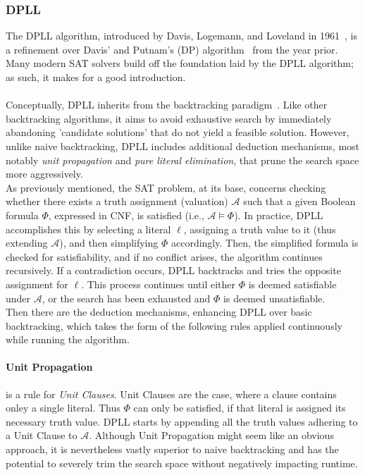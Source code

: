 \subsubsection{DPLL}
The DPLL algorithm, introduced by Davis, Logemann, and Loveland in 1961~\cite{Original-DPLL-Article}, is a refinement over Davis' and Putnam's (DP) algorithm~\cite{Original-DP-Article} from the year prior. Many modern SAT solvers build off the foundation laid by the DPLL algorithm; as such, it makes for a good introduction.
\\
\\
Conceptually, DPLL inherits from the backtracking paradigm~\cite{Wiki-backtracking}. Like other backtracking algorithms, it aims to avoid exhaustive search by immediately abandoning  'candidate solutions' that do not yield a feasible solution. However, unlike naive backtracking, DPLL includes additional deduction mechanisms, most notably \emph{unit propagation} and \emph{pure literal elimination}, that prune the search space more aggressively.
\\
As previously mentioned, the SAT problem, at its base, concerns checking whether there exists a truth assignment (valuation) \(\mathcal{A}\) such that a given Boolean formula \(\Phi\), expressed in CNF, is satisfied (i.e., \(\mathcal{A} \models \Phi\)). In practice, DPLL accomplishes this by selecting a literal \(\ell\), assigning a truth value to it (thus extending \(\mathcal{A}\)), and then simplifying \(\Phi\) accordingly. Then, the simplified formula is checked for satisfiability, and if no conflict arises, the algorithm continues recursively. If a contradiction occurs, DPLL backtracks and tries the opposite assignment for \(\ell\). This process continues until either \(\Phi\) is deemed satisfiable under \(\mathcal{A}\), or the search has been exhausted and \(\Phi\) is deemed unsatisfiable.
\\
Then there are the deduction mechanisms, enhancing DPLL over basic backtracking, which takes the form of the following rules applied continuously while running the algorithm.

\paragraph{Unit Propagation} is a rule for \emph{Unit Clauses}. Unit Clauses are the case, where a clause contains onley a single literal. Thus \(\Phi\) can only be satisfied, if that literal is assigned its necessary truth value. DPLL starts by appending all the truth values adhering to a Unit Clause to \(\mathcal{A}\). Although Unit Propagation might seem like an obvious approach, it is nevertheless vastly superior to naive backtracking and has the potential to severely trim the search space without negatively impacting runtime.

